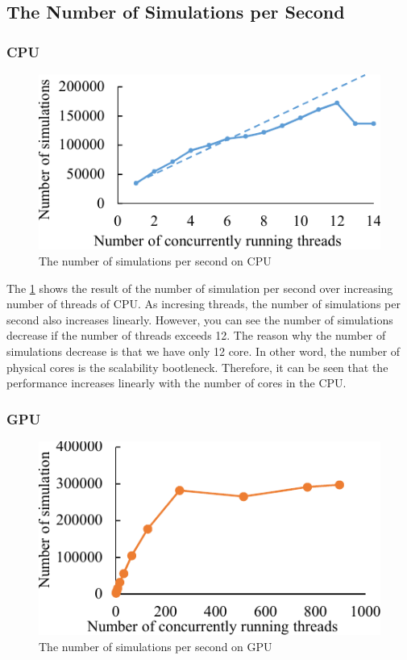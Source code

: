 \subsection{The Number of Simulations per Second}
\subsubsection{CPU}
\begin{figure}
\includegraphics[width=0.95\columnwidth]{figures/cpu_num_simulation.pdf}
\caption{The number of simulations per second on CPU}
\label{fig:cpu_num_simulation}
\end{figure}

The \cref{fig:cpu_num_simulation} shows the result of the number of simulation per second over increasing number of threads of CPU. 
As incresing threads, the number of simulations per second also increases linearly. 
However, you can see the number of simulations decrease if the number of threads exceeds 12. 
The reason why the number of simulations decrease is that we have only 12 core. In other word, the number of physical cores is the scalability bootleneck. 
Therefore, it can be seen that the performance increases linearly with the number of cores in the CPU. 
\subsubsection{GPU}
\begin{figure}
\includegraphics[width=0.95\columnwidth]{figures/gpu_num_simulation.pdf}
\caption{The number of simulations per second on GPU}
\label{fig:gpu_num_simulation}
\end{figure}

